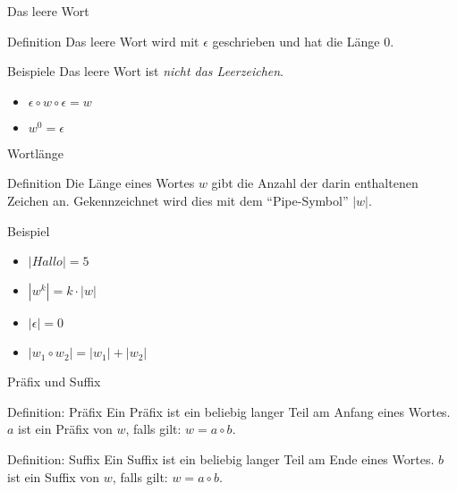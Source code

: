 \documentclass[18pt]{beamer}
\begin{document}
\begin{frame}{Das leere Wort}
    \begin{block}{Definition}
        Das leere Wort wird mit $\epsilon$ geschrieben und hat die Länge $0$.
    \end{block}
    \begin{exampleblock}{Beispiele}
        Das leere Wort ist \emph{nicht das Leerzeichen}. 
        \begin{itemize}
            \item $\epsilon \circ w \circ \epsilon = w$
            \item $w^0 = \epsilon$
        \end{itemize}
    \end{exampleblock}
\end{frame}

\begin{frame}{Wortlänge}
    \begin{block}{Definition}
        Die Länge eines Wortes $w$ gibt die Anzahl der darin enthaltenen Zeichen an. Gekennzeichnet wird dies mit dem "`Pipe-Symbol"' $\left| w \right|$.
    \end{block}
    \begin{exampleblock}{Beispiel}
        \begin{itemize}
            \item $\left| Hallo\right| = 5$
                \pause
            \item $\left| w^k\right| = k\cdot \left| w\right|$
                \pause
            \item $\left| \epsilon\right| = 0$
                \pause
            \item $\left| w_1 \circ w_2 \right| = \left| w_1\right| + \left| w_2\right|$
        \end{itemize}
    \end{exampleblock}
\end{frame}

\begin{frame}{Präfix und Suffix}
    \begin{block}{Definition: Präfix}
        Ein Präfix ist ein beliebig langer Teil am Anfang eines Wortes. $a$ ist ein Präfix von $w$, falls gilt: $w = a \circ b$.
    \end{block}
    \pause
    \begin{block}{Definition: Suffix}
        Ein Suffix ist ein beliebig langer Teil am Ende eines Wortes. $b$ ist ein Suffix von $w$, falls gilt: $w = a\circ b$.
    \end{block}
\end{frame}
\end{document}

